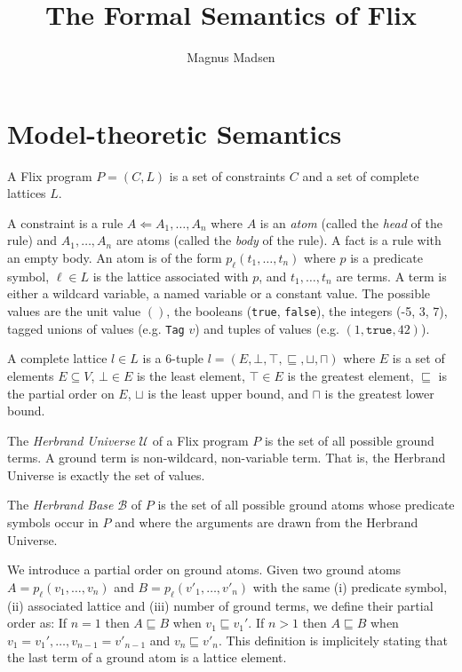 \documentclass[10pt,twocolumn]{article}
\title{The Formal Semantics of Flix}
\author{Magnus Madsen}
\date{}
\begin{document}
\maketitle

\section{Model-theoretic Semantics}

A Flix program $P = (C, L)$ is a set of constraints $C$ and a set of complete lattices $L$.

A constraint is a rule $A \Leftarrow A_1, \dots, A_n$ 
where $A$ is an \emph{atom} (called the \emph{head} of the rule) 
and $A_1, \dots, A_n$ are atoms (called the \emph{body} of the rule).
A fact is a rule with an empty body.
An atom is of the form $p_\ell(t_1, \dots, t_n)$ where 
$p$ is a predicate symbol,
$\ell \in L$ is the lattice associated with $p$, and
$t_1, \dots, t_n$ are terms. 
A term is either a wildcard variable, a named variable or a constant value. 
The possible values are the unit value $()$, the booleans (\texttt{true}, \texttt{false}),
the integers (-5, 3, 7), tagged unions of values (e.g. \texttt{Tag} $v$) and 
tuples of values (e.g. $(1, \texttt{true}, 42)$).

A complete lattice $l \in L$ is a 6-tuple $l = (E, \bot, \top, \sqsubseteq, \sqcup, \sqcap)$ where 
$E$ is a set of elements $E \subseteq V$,
$\bot \in E$ is the least element,
$\top \in E$ is the greatest element,
$\sqsubseteq$ is the partial order on $E$,
$\sqcup$ is the least upper bound, and
$\sqcap$ is the greatest lower bound.

The \emph{Herbrand Universe} $\mathcal{U}$ of a Flix program $P$ is the set of all possible ground terms.
A ground term is non-wildcard, non-variable term. That is, the Herbrand Universe is exactly the set of values.

The \emph{Herbrand Base} $\mathcal{B}$ of $P$ is the set of all possible ground atoms whose
predicate symbols occur in $P$ and where the arguments are drawn from the Herbrand Universe.

We introduce a partial order on ground atoms. 
Given two ground atoms $A = p_\ell(v_1, \dots, v_n)$ and $B = p_\ell(v'_1, \dots, v'_n)$ with the same 
(i) predicate symbol, 
(ii) associated lattice and 
(iii) number of ground terms, we define their partial order as:
If $n = 1$ then $A \sqsubseteq B$ when $v_1 \sqsubseteq v_1'$.
If $n > 1$ then $A \sqsubseteq B$ when $v_1 = v_1', \dots, v_{n - 1} = v'_{n - 1}$ and $v_n \sqsubseteq v'_n$.
This definition is implicitely stating that the last term of a ground atom is a lattice element.
\end{document}
